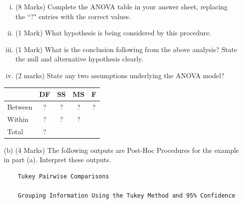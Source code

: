 \documentclass[a4paper,12pt]{article}
\begin{document}
\begin{itemize}


%


\begin{enumerate}[(i)]
	\item (8 Marks) Complete the ANOVA table in your answer sheet, replacing the ``?" entries with the correct values.
	\item (1 Mark) What hypothesis is being considered by this procedure.
	\item (1 Mark) What is the conclusion following from the above analysis? State the null and alternative hypothesis clearly.
	\item (2 marks) State any two assumptions underlying the ANOVA model?
\end{enumerate}

\bigskip
{
	
	\begin{center}
		\begin{tabular}{|l||c|c|c|c|}
			\hline \phantom{makespace} & DF & SS & MS & F \\ \hline
			\hline Between & \phantom{make}? \phantom{make} & \phantom{make}? \phantom{make} & ?  &  ?\\ 
			\hline Within & \phantom{make}? \phantom{make} &\phantom{make}? \phantom{make}  &\phantom{make}? \phantom{make} &  \\ \hline
			\hline Total &  \phantom{make}? \phantom{make} &  &\phantom{makespace}  & \phantom{makespace} \\ 
			\hline 
		\end{tabular} 
	\end{center}
}
\bigskip

\item[(b)] (4 Marks) The following outputs are Post-Hoc Procedures for the example in part (a). Interpret these outputs.

\begin{framed}
	\begin{verbatim}
	Tukey Pairwise Comparisons 
	
	Grouping Information Using the Tukey Method and 95% Confidence
	

\end{verbatim}
\end{framed}
\end{itemize}
\end{document}
